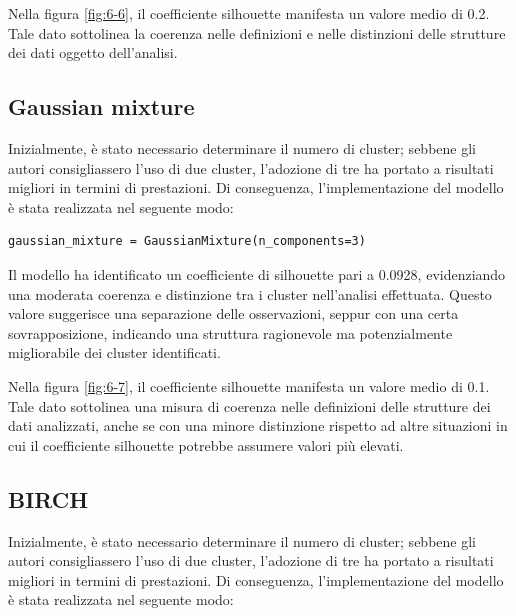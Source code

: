 \bigskip

Nella figura \ref{fig:6-6}, il coefficiente silhouette manifesta un valore medio di 0.2. Tale dato sottolinea la coerenza nelle definizioni e nelle distinzioni delle strutture dei dati oggetto dell'analisi.

\subsection{Gaussian mixture}

Inizialmente, è stato necessario determinare il numero di cluster; sebbene gli autori \cite{iqbal2022exploring} consigliassero l'uso di due cluster, l'adozione di tre ha portato a risultati migliori in termini di prestazioni. Di conseguenza, l'implementazione del modello è stata realizzata nel seguente modo:

\bigskip

\begin{lstlisting}
gaussian_mixture = GaussianMixture(n_components=3)
\end{lstlisting}

\bigskip

Il modello ha identificato un coefficiente di silhouette pari a 0.0928, evidenziando una moderata coerenza e distinzione tra i cluster nell'analisi effettuata. Questo valore suggerisce una separazione delle osservazioni, seppur con una certa sovrapposizione, indicando una struttura ragionevole ma potenzialmente migliorabile dei cluster identificati.

\bigskip

Nella figura \ref{fig:6-7}, il coefficiente silhouette manifesta un valore medio di 0.1. Tale dato sottolinea una misura di coerenza nelle definizioni delle strutture dei dati analizzati, anche se con una minore distinzione rispetto ad altre situazioni in cui il coefficiente silhouette potrebbe assumere valori più elevati.

\subsection{BIRCH}

Inizialmente, è stato necessario determinare il numero di cluster; sebbene gli autori \cite{iqbal2022exploring} consigliassero l'uso di due cluster, l'adozione di tre ha portato a risultati migliori in termini di prestazioni. Di conseguenza, l'implementazione del modello è stata realizzata nel seguente modo:

\bigskip

